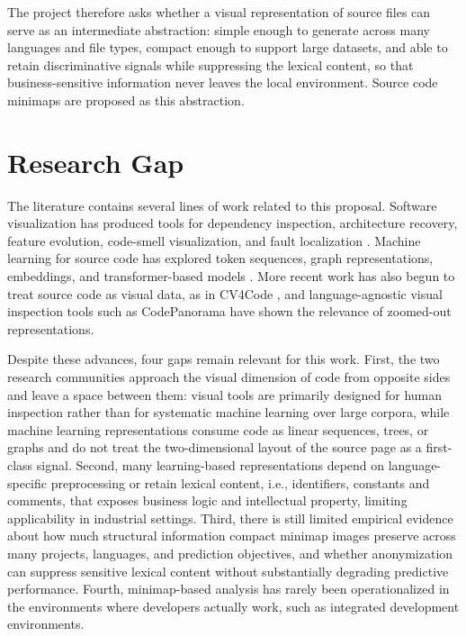 The project therefore asks whether a visual representation of source files can
serve as an intermediate abstraction: simple enough to generate across many
languages and file types, compact enough to support large datasets, and able to
retain discriminative signals while suppressing the lexical content, so that
business-sensitive information never leaves the local environment. Source code
minimaps are proposed as this abstraction.

\section{Research Gap}

The literature contains several lines of work related to this proposal. Software
visualization has produced tools for dependency inspection, architecture
recovery, feature evolution, code-smell visualization, and fault localization
\cite{pinzger2008tool,novais2013sourceminer,kobayashi2013sarf,reis2022code,sun2024sflvis}.
Machine learning for source code has explored token sequences, graph
representations, embeddings, and transformer-based models
\cite{allamanis2018survey,feng2020codebert,guo2021graphcodebert,yang2025sparsecoder}.
More recent work has also begun to treat source code as visual data, as in
CV4Code \cite{shi2023cv4code}, and language-agnostic visual inspection tools
such as CodePanorama \cite{etter2022codepanorama} have shown the relevance of
zoomed-out representations.

Despite these advances, four gaps remain relevant for this work.
First, the two research communities approach the visual dimension of code from
opposite sides and leave a space between them: visual tools are primarily
designed for human inspection rather than for systematic machine learning over
large corpora, while machine learning representations consume code as linear
sequences, trees, or graphs and do not treat the two-dimensional layout of the
source page as a first-class signal. Second, many learning-based
representations depend on language-specific preprocessing or retain lexical
content, i.e., identifiers, constants and comments, that exposes business logic
and intellectual property, limiting applicability in industrial settings. Third,
there is still limited empirical evidence about how much structural information
compact minimap images preserve across many projects, languages, and prediction
objectives, and whether anonymization can suppress sensitive lexical content
without substantially degrading predictive performance. Fourth, minimap-based
analysis has rarely been operationalized in the environments where developers
actually work, such as integrated development environments.

